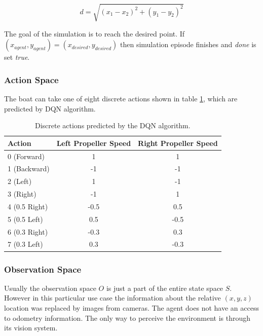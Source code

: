 \begin{equation}
    d = \sqrt{(x_1 - x_2)^2 + (y_1-y_2)^2}
\end{equation}

The goal of the simulation is to reach the desired point. If $(x_{agent}, y_{agent}) = (x_{desired}, y_{desired})$ then simulation episode finishes and \emph{done} is set \emph{true}.

\newpage

\subsubsection*{Action Space}
\label{sub2:action-space}

The boat can take one of eight discrete actions shown in table \ref{tab:action-space}, which are predicted by DQN algorithm.

\begin{table}[h]
\centering
\begin{tabular}{||l c c ||}
    \hline
     Action & Left Propeller Speed & Right Propeller Speed \\
     \hline\hline
     0 (Forward) & 1 & 1 \\
     1 (Backward) & -1 & -1 \\
     2 (Left) & 1 & -1 \\
     3 (Right) & -1 & 1 \\
     4 (0.5 Right) & -0.5 & 0.5 \\
     5 (0.5 Left) & 0.5 & -0.5 \\
     6 (0.3 Right) & -0.3 & 0.3 \\
     7 (0.3 Left) & 0.3 & -0.3 \\
    \hline
\end{tabular}
\caption{Discrete actions predicted by the DQN algorithm.}
\label{tab:action-space}
\end{table}

\subsubsection*{Observation Space}
\label{sub2:observation-space}

Usually the observation space $O$ is just a part of the entire state space $S$. However in this particular use case the information about
the relative $(x, y, z)$ location was replaced by images from cameras. The agent does not have an access to odometry information. The only way to perceive the environment is through its vision system.


